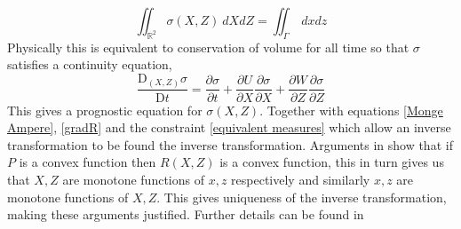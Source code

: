 \begin{equation}
	\iint_{\mathbb{R}^2} \sigma\left(X,Z\right) \ dXdZ = \iint_\Gamma \ dxdz
\label{equivalent measures}
\end{equation} 
Physically this is equivalent to conservation of volume for all time so that $\sigma$ satisfies a continuity equation,
\begin{equation}
	\frac{\textrm{D}_{(X,Z)}\sigma}{\textrm{D}t} = \frac{\partial \sigma}{\partial t} + \frac{\partial U}{\partial X}\frac{\partial \sigma}{\partial X}+ \frac{\partial W}{\partial Z}\frac{\partial \sigma}{\partial Z}
\end{equation}
This gives a prognostic equation for $\sigma(X ,Z)$. Together with equations \ref{Monge Ampere}, \ref{gradR} and the constraint \ref{equivalent measures} which allow an inverse transformation to be found the inverse transformation. Arguments in \cite{Cullen2006a} show that if $P$ is a convex function then $R(X,Z)$ is a convex function, this in turn gives us that $X,Z$ are monotone functions of $x,z$ respectively and similarly $x,z$ are monotone functions of $X,Z$. This gives uniqueness of the inverse transformation, making these arguments justified. Further details can be found in \cite{Cullen2006a}
